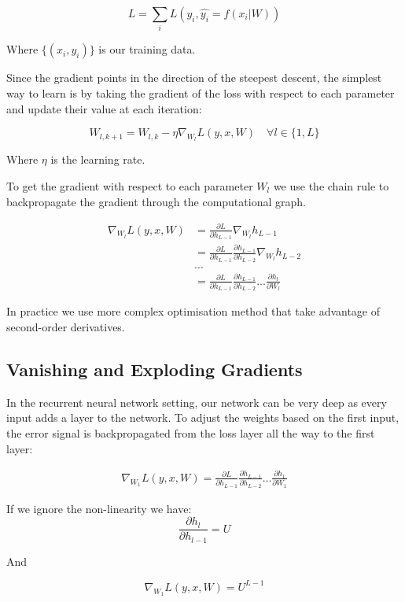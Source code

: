 \documentclass[10pt,oneside,openright]{report}
\begin{document}
$$L = \sum_i L(y_i, \hat{y_i} = f(x_i|W))$$

Where $\{(x_i, y_i)\}$ is our training data. 

Since the gradient points in the direction of the steepest descent, the simplest way to learn is by taking the gradient of the loss with respect to each parameter and update their value at each iteration:

$$ W_{l, k+1} = W_{l, k} - \eta \nabla_{W_l} L(y, x, W) \quad \forall l \in \{1, L\}$$

Where $\eta$ is the learning rate.
 
To get the gradient with respect to each parameter $W_l$ we use the chain rule to backpropagate the gradient through the computational graph.
 
 \begin{align}
   \nabla_{W_l} L(y, x, W) &= \frac{\partial L}{\partial h_{L-1}} \nabla_{W_l} h_{L-1}\\
   &= \frac{\partial L}{\partial h_{L-1}} \frac{\partial h_{L-1}}{\partial h_{L-2}} \nabla_{W_l} h_{L-2}\\
   &...\\
   &= \frac{\partial L}{\partial h_{L-1}} \frac{\partial h_{L-1}}{\partial h_{L-2}} ... \frac{\partial h_l}{\partial W_l}
 \end{align}
 
In practice we use more complex optimisation method that take advantage of second-order derivatives. 
 
\subsection{Vanishing and Exploding Gradients}
In the recurrent neural network setting, our network can be very deep as every input adds a layer to the network. To adjust the weights based on the first input, the error signal is backpropagated from the loss layer all the way to the first layer: 

 \begin{align}
   \nabla_{W_1} L(y, x, W) = \frac{\partial L}{\partial h_{L-1}} \frac{\partial h_{L-1}}{\partial h_{L-2}} ... \frac{\partial h_1}{\partial W_1}
 \end{align}
 
 If we ignore the non-linearity we have:
 $$ \frac{\partial h_{l}}{\partial h_{l-1}} = U $$
 
 And 
 
 $$ \nabla_{W_1} L(y, x, W) = U^{L-1}$$
 
\end{document}
